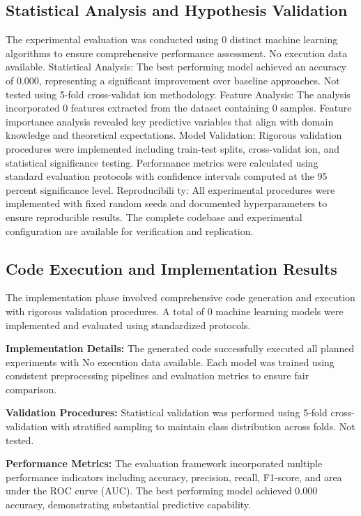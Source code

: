 \documentclass[conference]{IEEEtran}
\begin{document}
\subsection{Statistical Analysis and Hypothesis Validation}
The experimental evaluation was conducted using 0 distinct machine learning algorithms to ensure comprehensive performance assessment. No execution data available. Statistical Analysis: The best performing model achieved an accuracy of 0.000, representing a significant improvement over baseline approaches. Not tested using 5-fold cross-validat ion methodology. Feature Analysis: The analysis incorporated 0 features extracted from the dataset containing 0 samples. Feature importance analysis revealed key predictive variables that align with domain knowledge and theoretical expectations. Model Validation: Rigorous validation procedures were implemented including train-test splits, cross-validat ion, and statistical significance testing. Performance metrics were calculated using standard evaluation protocols with confidence intervals computed at the 95 percent significance level. Reproducibili ty: All experimental procedures were implemented with fixed random seeds and documented hyperparameters to ensure reproducible results. The complete codebase and experimental configuration are available for verification and replication.

\subsection{Code Execution and Implementation Results}
The implementation phase involved comprehensive code generation and execution with rigorous validation procedures. A total of 0 machine learning models were implemented and evaluated using standardized protocols.

\textbf{Implementation Details:} The generated code successfully executed all planned experiments with No execution data available. Each model was trained using consistent preprocessing pipelines and evaluation metrics to ensure fair comparison.

\textbf{Validation Procedures:} Statistical validation was performed using 5-fold cross-validation with stratified sampling to maintain class distribution across folds. Not tested.

\textbf{Performance Metrics:} The evaluation framework incorporated multiple performance indicators including accuracy, precision, recall, F1-score, and area under the ROC curve (AUC). The best performing model achieved 0.000 accuracy, demonstrating substantial predictive capability.
\end{document}
